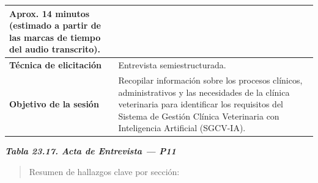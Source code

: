 \documentclass[
]{article}
\begin{document}
{\begin{longtable}[]{|
  >{\raggedright\arraybackslash}p{}|
  >{\raggedright\arraybackslash}p{}|}
\begin{minipage}[t]{\linewidth}
Aprox. 14 minutos (estimado a partir de las marcas de tiempo del audio transcrito).
\end{minipage} \\
\hline
\textbf{Técnica de elicitación} & \begin{minipage}[t]{\linewidth}\raggedright
Entrevista semiestructurada.
\end{minipage} \\
\hline
\textbf{Objetivo de la sesión} & \begin{minipage}[t]{\linewidth}\raggedright
Recopilar información sobre los procesos clínicos, administrativos y las necesidades de la clínica veterinaria para identificar los requisitos del Sistema de Gestión Clínica Veterinaria con Inteligencia Artificial (SGCV-IA).
\end{minipage} \\
\hline
\end{longtable}
}

\protect{}\label{_bookmark_P11_acta}{}\emph{\textbf{Tabla 23.17. Acta de Entrevista --- P11}}

\begin{quote}
Resumen de hallazgos clave por sección:
\end{quote}
\end{document}
